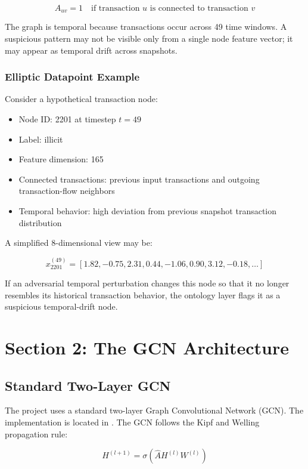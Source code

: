 \documentclass[12pt,a4paper]{article}
\begin{document}
$$
A_{uv}=1 \quad \text{if transaction } u \text{ is connected to transaction } v
$$

The graph is temporal because transactions occur across 49 time windows. A suspicious pattern may not be visible only from a single node feature vector; it may appear as temporal drift across snapshots.

\subsubsection{Elliptic Datapoint Example}
Consider a hypothetical transaction node:

\begin{itemize}
    \item Node ID: 2201 at timestep $t=49$
    \item Label: illicit
    \item Feature dimension: 165
    \item Connected transactions: previous input transactions and outgoing transaction-flow neighbors
    \item Temporal behavior: high deviation from previous snapshot transaction distribution
\end{itemize}

A simplified 8-dimensional view may be:

$$
x_{2201}^{(49)}=[1.82,-0.75,2.31,0.44,-1.06,0.90,3.12,-0.18,\ldots]
$$

If an adversarial temporal perturbation changes this node so that it no longer resembles its historical transaction behavior, the ontology layer flags it as a suspicious temporal-drift node.

\section{Section 2: The GCN Architecture}

\subsection{Standard Two-Layer GCN}
The project uses a standard two-layer Graph Convolutional Network (GCN). The implementation is located in . The GCN follows the Kipf and Welling propagation rule:

$$
H^{(l+1)}=\sigma(\hat{A}H^{(l)}W^{(l)})
$$
\end{document}

